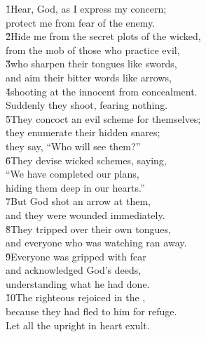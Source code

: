 \begin{poetry}
\poeml \v{1}Hear, God, as I express my concern; \\
\poemll    protect me from fear of the enemy. \\
\poeml \v{2}Hide me from the secret plots of the wicked, \\
\poemll    from the mob of those who practice evil, \\
\poeml \v{3}who sharpen their tongues like swords, \\
\poemll    and aim their bitter words like arrows, \\
\poeml \v{4}shooting at the innocent from concealment. \\
\poeml Suddenly they shoot, fearing nothing. \\
\poeml \v{5}They concoct an evil scheme for themselves; \\
\poeml they enumerate their hidden snares; \\
\poemll    they say, ``Who will see them?'' \\
\poeml \v{6}They devise wicked schemes, saying, \\
\poemll    ``We have completed our plans, \\
\poemlll       hiding them deep in our hearts.'' \\
\poeml \v{7}But God shot an arrow at them, \\
\poemll    and they were wounded immediately. \\
\poeml \v{8}They tripped over their own tongues, \\
\poemll    and everyone who was watching ran away. \\
\poeml \v{9}Everyone was gripped with fear \\
\poemll    and acknowledged God's deeds, \\
\poemlll       understanding what he had done. \\
\poeml \v{10}The righteous rejoiced in the , \\
\poemll    because they had fled to him for refuge. \\
\poemlll       Let all the upright in heart exult.
\end{poetry}


